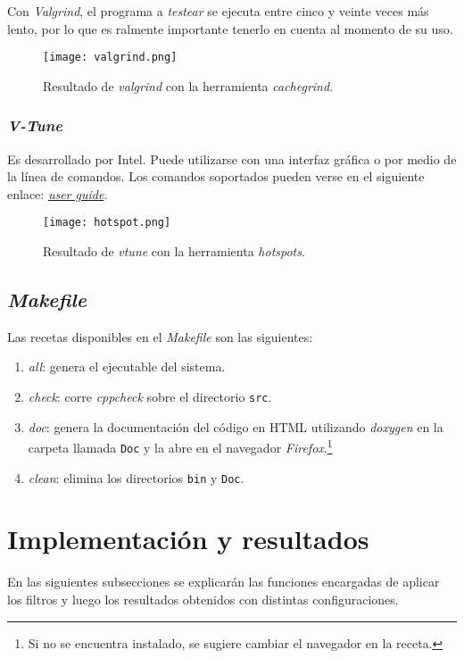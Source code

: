 \documentclass[12pt,a4paper]{article}
\begin{document}
Con \emph{Valgrind}, el programa a \emph{testear} se ejecuta entre cinco y veinte
veces más lento, por lo que es ralmente importante tenerlo en cuenta al momento
de su uso.

\begin{figure}[H]
  \centering
  \texttt{[image: valgrind.png]}
  \caption{Resultado de \emph{valgrind} con la herramienta \emph{cachegrind}.}
  \label{cachegrind}
\end{figure}

\subsubsection{\emph{V-Tune}}
\label{vtune}
Es desarrollado por Intel. Puede utilizarse con una interfaz gráfica o por medio de
la línea de comandos. Los comandos soportados pueden verse en el siguiente enlace:
\href{https://software.intel.com/content/www/us/en/develop/documentation/vtune-help/top.html}
{\emph{user guide}}.

\begin{figure}[H]
  \centering
  \texttt{[image: hotspot.png]}
  \caption{Resultado de \emph{vtune} con la herramienta \emph{hotspots}.}
  \label{hotspot}
\end{figure}

\subsection{\emph{Makefile}}
\label{make}
Las recetas disponibles en el \emph{Makefile} son las siguientes:

\begin{enumerate}[leftmargin=1.5cm]
  \item \emph{all}: genera el ejecutable del sistema.
  \item \emph{check}: corre \emph{cppcheck} sobre el directorio
  \verb|src|.
  \item \emph{doc}: genera la documentación del código en HTML
  utilizando \emph{doxygen} en la carpeta llamada \verb|Doc| y la
  abre en el navegador \emph{Firefox}.\footnote{Si no se encuentra
  instalado, se sugiere cambiar el navegador en la receta.}
  \item \emph{clean}: elimina los directorios \verb|bin| y
  \verb|Doc|.
\end{enumerate}


\section{Implementación y resultados}
\label{impres}
En las siguientes subsecciones se explicarán las funciones encargadas de aplicar
los filtros y luego los resultados obtenidos con distintas configuraciones.
\end{document}
